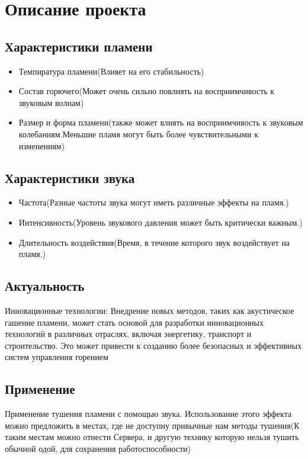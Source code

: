 \documentclass[a4paper,12pt]{article}
\begin{document}
\section{Описание проекта}
\subsection{Характеристики пламени}
\begin{itemize}
    \item Темпиратура пламени(Влияет на его стабильность)
    \item Состав горючего(Может очень сильно повлиять на восприимчивость к звуковым волнам)
    \item Размер и форма пламени(также может влиять на восприимчивость к звуковым колебаниям.Меньшие пламя могут быть более чувствительными к изменениям)
\end{itemize}
\subsection{Характеристики звука}
\begin{itemize}
    \item Частота(Разные частоты звука могут иметь различные эффекты на пламя.)
    \item Интенсивность(Уровень звукового давления может быть критически важным.)
    \item Длительность воздействия(Время, в течение которого звук воздействует на пламя.)
\end{itemize}
\subsection{Актуальность}
Инновационные технологии: Внедрение новых методов, таких как акустическое гашение пламени, может стать основой для разработки инновационных технологий в различных отраслях, включая энергетику, транспорт и строительство. Это может привести к созданию более безопасных и эффективных систем управления горением
\subsection{Применение}
Применение тушения пламени с помощью звука. Использование этого эффекта можно предложить в местах, где не доступну привычные нам методы тушения(К таким местам можно отнести Сервера, и другую технику которую нельзя тушить обычной одой, для сохранения работоспособности)
\end{document}
